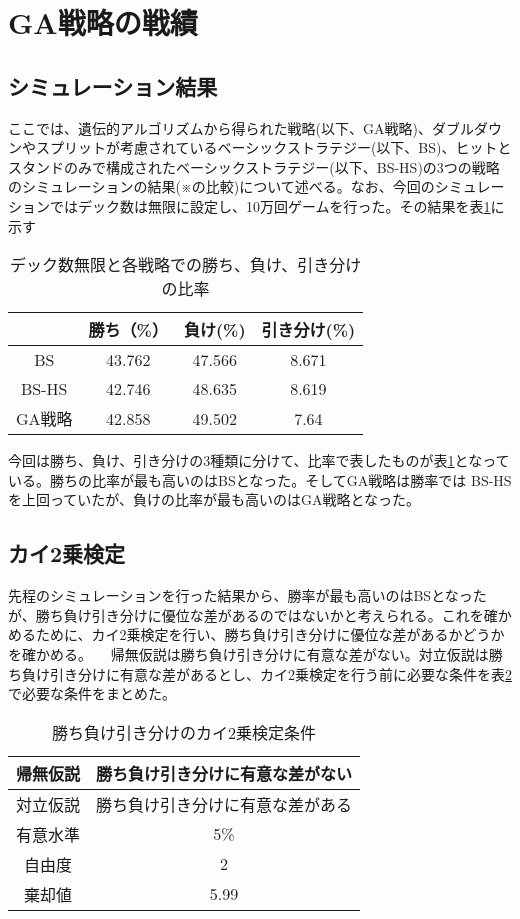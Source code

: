 \section{GA戦略の戦績}
\subsection{シミュレーション結果}
ここでは、遺伝的アルゴリズムから得られた戦略(以下、GA戦略)、ダブルダウンやスプリットが考慮されているベーシックストラテジー(以下、BS)、ヒットとスタンドのみで構成されたベーシックストラテジー(以下、BS-HS)の3つの戦略のシミュレーションの結果(※の比較)について述べる。なお、今回のシミュレーションではデック数は無限に設定し、10万回ゲームを行った。その結果を表\ref{tab:score}に示す

\begin{table}[H]
 \caption{デック数無限と各戦略での勝ち、負け、引き分けの比率}
 \begin{center}
  \begin{tabular}{|c|c|c|c|}
  \hline   & 勝ち（\%） & 負け(\%)  & 引き分け(\%) \\
  \hline BS & 43.762 & 47.566 & 8.671 \\
  \hline BS-HS & 42.746 & 48.635 & 8.619 \\
  \hline GA戦略 & 42.858 & 49.502 & 7.64 \\
  \hline
  \end{tabular}
  \label{tab:score}
 \end{center}
\end{table}

今回は勝ち、負け、引き分けの3種類に分けて、比率で表したものが表\ref{tab:score}となっている。勝ちの比率が最も高いのはBSとなった。そしてGA戦略は勝率では BS-HSを上回っていたが、負けの比率が最も高いのはGA戦略となった。

\subsection{カイ2乗検定}
先程のシミュレーションを行った結果から、勝率が最も高いのはBSとなったが、勝ち負け引き分けに優位な差があるのではないかと考えられる。これを確かめるために、カイ2乗検定を行い、勝ち負け引き分けに優位な差があるかどうかを確かめる。
　帰無仮説は勝ち負け引き分けに有意な差がない。対立仮説は勝ち負け引き分けに有意な差があるとし、カイ2乗検定を行う前に必要な条件を表\ref{score-x}で必要な条件をまとめた。
\begin{table}[H]
 \caption{勝ち負け引き分けのカイ2乗検定条件\label{score-x}}
 \begin{center}
  \begin{tabular}{|c|c|}
  \hline 帰無仮説 & 勝ち負け引き分けに有意な差がない \\
  \hline 対立仮説 & 勝ち負け引き分けに有意な差がある \\
  \hline 有意水準 & 5\% \\
  \hline 自由度 & 2 \\
  \hline 棄却値 & 5.99 \\
  \hline
  \end{tabular}
 \end{center}
\end{table}

